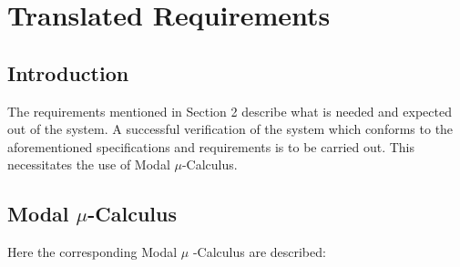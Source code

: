 \documentclass[a4paper,12pt]{article}
\begin{document}
	\section{Translated Requirements}
	\subsection{Introduction}
	The requirements mentioned in Section 2 describe what is needed and expected out of the system. A successful verification of the system which conforms to the aforementioned specifications and requirements is to be carried out. This necessitates the use of Modal $\mu$-Calculus.   
	\subsection{Modal $\mu$-Calculus}
	Here the corresponding Modal $\mu$ -Calculus are described:
\end{document}
